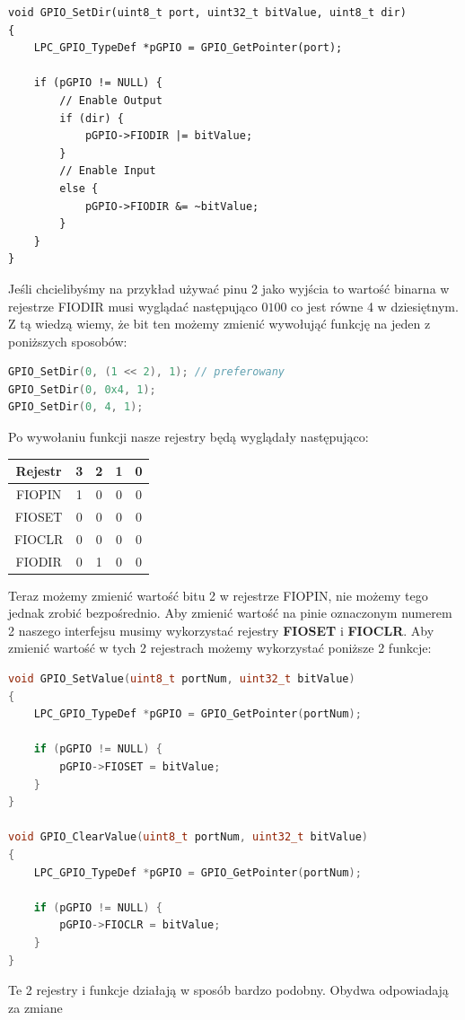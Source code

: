 \documentclass[11pt]{article}
\begin{document}
\begin{lstlisting}
void GPIO_SetDir(uint8_t port, uint32_t bitValue, uint8_t dir)
{
	LPC_GPIO_TypeDef *pGPIO = GPIO_GetPointer(port);

	if (pGPIO != NULL) {
		// Enable Output
		if (dir) {
			pGPIO->FIODIR |= bitValue;
		}
		// Enable Input
		else {
			pGPIO->FIODIR &= ~bitValue;
		}
	}
}
\end{lstlisting}
Jeśli chcielibyśmy na przykład używać pinu 2 jako wyjścia to wartość binarna
w rejestrze FIODIR musi wyglądać następująco $0100$ co jest równe 4 w dziesiętnym.
Z tą wiedzą wiemy, że bit ten możemy zmienić wywołująć funkcję na jeden z poniższych sposobów:

\begin{lstlisting}[language=c]
GPIO_SetDir(0, (1 << 2), 1); // preferowany
GPIO_SetDir(0, 0x4, 1);
GPIO_SetDir(0, 4, 1);
\end{lstlisting}
Po wywołaniu funkcji nasze rejestry będą wyglądały następująco:
\begin{table}[H]
    \centering
    \begin{tabular}{|c|c|c|c|c|}
        \hline
        Rejestr & 3 & 2 & 1 & 0 \\ \hline
        FIOPIN & 1 & 0 & 0 & 0 \\ \hline
        FIOSET & 0 & 0 & 0 & 0 \\ \hline
        FIOCLR & 0 & 0 & 0 & 0 \\ \hline
        FIODIR & 0 & 1 & 0 & 0 \\ \hline
    \end{tabular}
\end{table}
Teraz możemy zmienić wartość bitu 2 w rejestrze FIOPIN, nie możemy tego jednak zrobić
bezpośrednio. Aby zmienić wartość na pinie oznaczonym numerem 2 naszego interfejsu
musimy wykorzystać rejestry \textbf{FIOSET} i \textbf{FIOCLR}. Aby zmienić wartość
w tych 2 rejestrach możemy wykorzystać poniższe 2 funkcje:
\begin{lstlisting}[language=c]
void GPIO_SetValue(uint8_t portNum, uint32_t bitValue)
{
    LPC_GPIO_TypeDef *pGPIO = GPIO_GetPointer(portNum);

    if (pGPIO != NULL) {
        pGPIO->FIOSET = bitValue;
    }
}

void GPIO_ClearValue(uint8_t portNum, uint32_t bitValue)
{
	LPC_GPIO_TypeDef *pGPIO = GPIO_GetPointer(portNum);

	if (pGPIO != NULL) {
		pGPIO->FIOCLR = bitValue;
	}
}
\end{lstlisting}
Te 2 rejestry i funkcje działają w sposób bardzo podobny. Obydwa odpowiadają za zmiane
\end{document}
